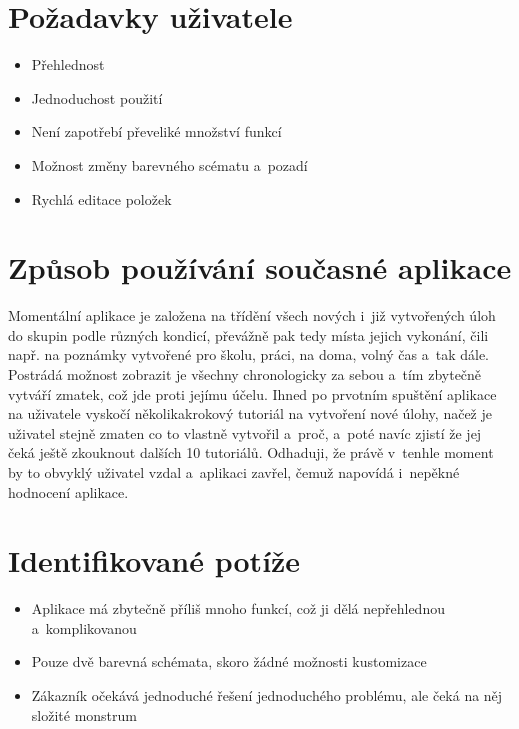 \documentclass[a4paper, 11pt, twocolumn]{article}
\begin{document}
	\section*{\large{Požadavky uživatele}} 
	\vspace*{-0.2cm}
	\begin{itemize}
		\item Přehlednost
		\vspace{-0.2cm}
		\item Jednoduchost použití
		\vspace{-0.2cm}
		\item Není zapotřebí převeliké množství funkcí
		\vspace{-0.2cm}
		\item Možnost změny barevného scématu a~pozadí
		\vspace{-0.2cm}
		\item Rychlá editace položek
	\end{itemize}

	\section*{\large{Způsob používání současné aplikace}}
	\vspace*{-0.2cm}
	Momentální aplikace je založena na třídění všech nových i~již vytvořených úloh do skupin podle různých kondicí, převážně pak tedy místa jejich vykonání, 
	čili např. na poznámky vytvořené pro školu, práci, na doma, volný čas a~tak dále. Postrádá možnost zobrazit je všechny chronologicky za sebou a~tím
	zbytečně vytváří zmatek, což jde proti jejímu účelu. Ihned po prvotním spuštění aplikace na uživatele vyskočí několikakrokový tutoriál na vytvoření nové
	úlohy, načež je uživatel stejně zmaten co to vlastně vytvořil a~proč, a~poté navíc zjistí že jej čeká ještě zkouknout dalších 10 tutoriálů. Odhaduji, že 
	právě v~tenhle moment by to obvyklý uživatel vzdal a~aplikaci zavřel, čemuž napovídá i~nepěkné hodnocení aplikace.


	\section*{\large{Identifikované potíže}}
	\vspace*{-0.2cm}
	\begin{itemize}
		\item Aplikace má zbytečně příliš mnoho funkcí, což ji dělá nepřehlednou a~komplikovanou
		\vspace{-0.2cm}
		\item Pouze dvě barevná schémata, skoro žádné možnosti kustomizace
		\vspace{-0.2cm}
		\item Zákazník očekává jednoduché řešení jednoduchého problému, ale čeká na něj složité monstrum
	\end{itemize}
\end{document}
